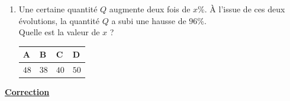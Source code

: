 \documentclass[oneside,12pt]{exam}          %
\begin{document}
\begin{enumerate}[resume*]
	\item Une certaine quantité $Q$ augmente deux fois de $x$\%. À l'issue de ces deux évolutions, la quantité $Q$ a subi une hausse de $96$\%. \\
	Quelle est la valeur de $x$ ?
	
		\hspace{\linewidth-\textwidth}
		\renewcommand{\arraystretch}{1.5}
		\begin{tabular}{| P{0.22\textwidth} | P{0.22\textwidth} | P{0.22\textwidth} | P{0.22\textwidth} |} \hline
			A & B & C & D \\ \hline
			$48$ & $38$ & $40$ & $50$ \\ \hline
		\end{tabular}	
		
\end{enumerate}



\newpage
\color{newblue}

\begin{center}
	\textbf{\underline{\Large Correction}}
\end{center}
\end{document}

